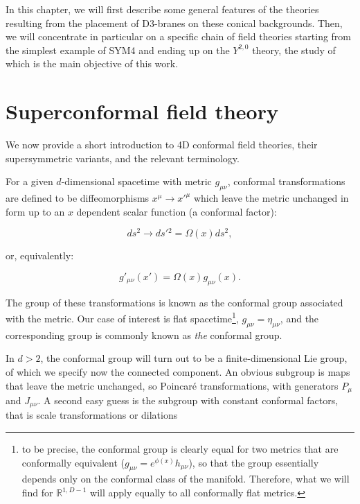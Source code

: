 In this chapter, we will first describe some general features of the theories resulting from the placement of D3-branes on these conical backgrounds. Then, we will concentrate in particular on a specific chain of field theories starting from the simplest example of SYM4 and ending up on the $Y^{2,0}$ theory, the study of which is the main objective of this work.

\section{Superconformal field theory}

We now provide a short introduction to 4D conformal field theories, their supersymmetric variants, and the relevant terminology.

For a given $d$-dimensional spacetime with metric $g_{\mu\nu}$, conformal transformations are defined to be diffeomorphisms $x^\mu \rightarrow x'^\mu$ which leave the metric unchanged in form up to an $x$ dependent scalar function (a conformal factor):

\begin{equation}
	ds^2 \rightarrow ds'{}^2 = \Omega(x) ds^2,
	\label{}
\end{equation}

or, equivalently:

\begin{equation}
	g'_{\mu\nu}(x') = \Omega(x) g_{\mu\nu}(x).
	\label{}
\end{equation}

The group of these transformations is known as the conformal group associated with the metric. Our case of interest is flat spacetime\footnote{to be precise, the conformal group is clearly equal for two metrics that are conformally equivalent ($g_{\mu\nu} = e^{\phi(x)} h_{\mu\nu}$), so that the group essentially depends only on the conformal class of the manifold. Therefore, what we will find for $\mathbb{R}^{1,D-1}$ will apply equally to all conformally flat metrics.}, $g_{\mu\nu} = \eta_{\mu\nu}$, and the corresponding group is commonly known as \emph{the} conformal group.

In $d>2$, the conformal group will turn out to be a finite-dimensional Lie group, of which we specify now the connected component. An obvious subgroup is maps that leave the metric unchanged, so Poincar\'e transformations, with generators $P_\mu$ and $J_{\mu\nu}$. A second easy guess is the subgroup with constant conformal factors, that is scale transformations or dilations

